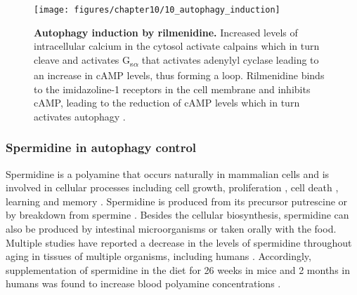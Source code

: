\begin{figure}[!htbp]
  \texttt{[image: figures/chapter10/10\_autophagy\_induction]}
  \caption[Autophagy induction by rilmenidine]{\textbf{Autophagy induction by rilmenidine.} Increased levels of intracellular calcium in the cytosol activate calpains which in turn cleave and activates G\textsubscript{s}\textsubscript{$\alpha$} that activates adenylyl cyclase leading to an increase in cAMP levels, thus forming a loop. Rilmenidine binds to the imidazoline-1 receptors in the cell membrane and inhibits cAMP, leading to the reduction of cAMP levels which in turn activates autophagy \citep{Fleming2011}.}  
  \label{fig:10_autophagy_induction}
\end{figure}

\subsubsection{Spermidine in autophagy control}
Spermidine is a polyamine that occurs naturally in mammalian cells and is involved in cellular processes including cell growth, proliferation \citep{Gonzalez-Polo2015,Madeo2018,Minois2014}, cell death \citep{Igarashi2010,Pegg2016}, learning and memory \citep{Guerra2016}. Spermidine is produced from its precursor putrescine or by breakdown from spermine \citep{Madeo2018}. Besides the cellular biosynthesis, spermidine can also be produced by intestinal microorganisms or taken orally with the food. Multiple studies have reported a decrease in the levels of spermidine throughout aging in tissues of multiple organisms, including humans \citep{Eisenberg2009,Gupta2013,Pucciarelli2012,Scalabrino1984}. Accordingly, supplementation of spermidine in the diet for 26 weeks in mice and 2 months in humans was found to increase blood polyamine concentrations \citep{Soda2009,Soda2013}. 


